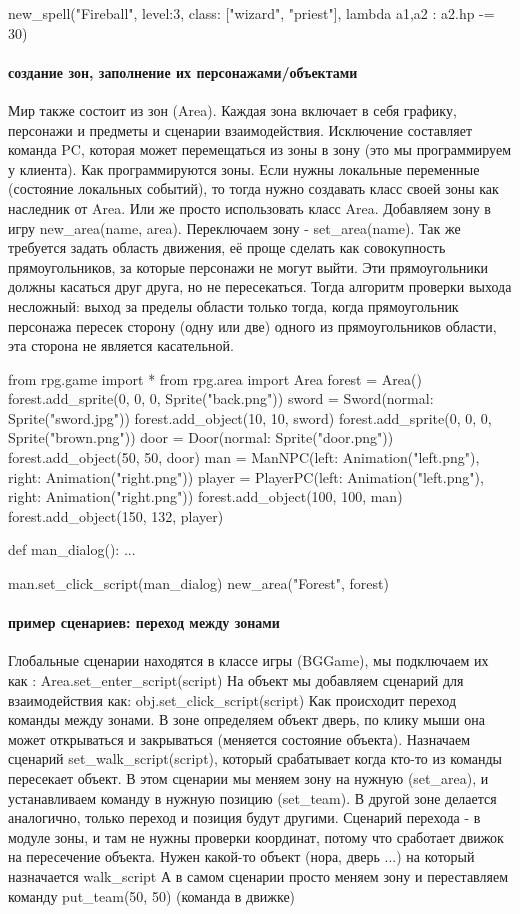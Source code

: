 new\_spell("Fireball", level:3, class: ["wizard", "priest"], lambda a1,a2 : a2.hp -= 30)

\paragraph{создание зон, заполнение их персонажами/объектами}
Мир также состоит из зон (Area). Каждая зона включает в себя графику, персонажи и предметы и сценарии взаимодействия. Исключение составляет команда PC, которая может перемещаться из зоны в зону (это мы программируем у клиента). Как программируются зоны. Если нужны локальные переменные (состояние локальных событий), то тогда нужно создавать класс своей зоны как наследник от Area. Или же просто использовать класс Area. Добавляем зону в игру new\_area(name, area). Переключаем зону - set\_area(name). Так же требуется задать область движения, её проще сделать как совокупность прямоугольников, за которые персонажи не могут выйти. Эти прямоугольники должны касаться друг друга, но не пересекаться. Тогда алгоритм проверки выхода несложный: выход за пределы области только тогда, когда прямоугольник персонажа пересек сторону (одну или две) одного из прямоугольников области, эта сторона не является касательной.

from rpg.game import *
from rpg.area import Area
forest = Area()
forest.add\_sprite(0, 0, 0, Sprite("back.png"))
sword = Sword(normal: Sprite("sword.jpg"))
forest.add\_object(10, 10, sword)
forest.add\_sprite(0, 0, 0, Sprite("brown.png"))
door = Door(normal: Sprite("door.png"))
forest.add\_object(50, 50, door)
man = ManNPC(left: Animation("left.png"), right: Animation("right.png"))
player = PlayerPC(left: Animation("left.png"), right: Animation("right.png"))
forest.add\_object(100, 100, man)
forest.add\_object(150, 132, player)

def man\_dialog():
...

man.set\_click\_script(man\_dialog)
new\_area("Forest", forest)

\paragraph{пример сценариев: переход между зонами}
Глобальные сценарии находятся в классе игры (BGGame), мы подключаем их как :
Area.set\_enter\_script(script)
На объект мы добавляем сценарий для взаимодействия как: obj.set\_click\_script(script)
Как происходит переход команды между зонами.
В зоне определяем объект дверь, по клику мыши она может открываться и закрываться (меняется состояние объекта). Назначаем сценарий set\_walk\_script(script), который срабатывает когда кто-то из команды пересекает объект. В этом сценарии мы меняем зону на нужную (set\_area), и устанавливаем команду в нужную позицию (set\_team). В другой зоне делается аналогично, только переход и позиция будут другими.
Сценарий перехода - в модуле зоны, и там не нужны проверки координат, потому что сработает движок на пересечение объекта. Нужен какой-то объект (нора, дверь ...) на который назначается walk\_script
А в самом сценарии просто меняем зону и переставляем команду put\_team(50, 50) (команда в движке)

